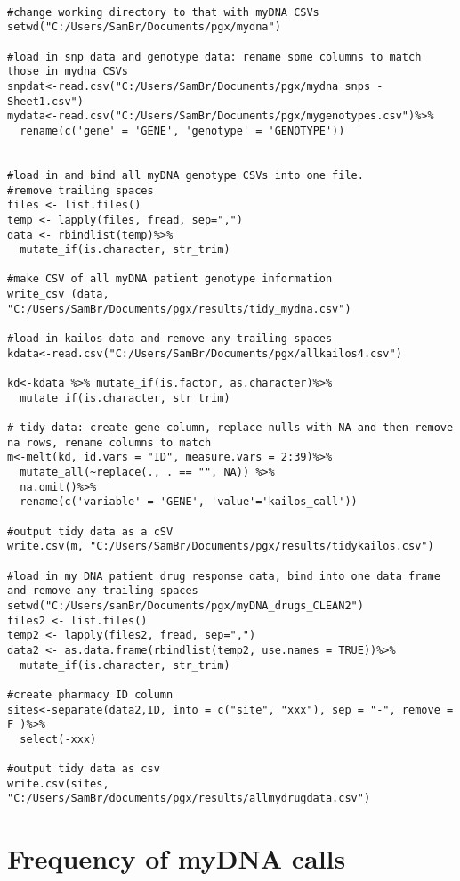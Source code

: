 \documentclass[]{article}
\begin{document}
\begin{verbatim}

#change working directory to that with myDNA CSVs
setwd("C:/Users/SamBr/Documents/pgx/mydna")

#load in snp data and genotype data: rename some columns to match those in mydna CSVs
snpdat<-read.csv("C:/Users/SamBr/Documents/pgx/mydna snps - Sheet1.csv")
mydata<-read.csv("C:/Users/SamBr/Documents/pgx/mygenotypes.csv")%>%
  rename(c('gene' = 'GENE', 'genotype' = 'GENOTYPE'))
  

#load in and bind all myDNA genotype CSVs into one file.
#remove trailing spaces
files <- list.files()
temp <- lapply(files, fread, sep=",")
data <- rbindlist(temp)%>%
  mutate_if(is.character, str_trim)

#make CSV of all myDNA patient genotype information
write_csv (data, "C:/Users/SamBr/Documents/pgx/results/tidy_mydna.csv")

#load in kailos data and remove any trailing spaces
kdata<-read.csv("C:/Users/SamBr/Documents/pgx/allkailos4.csv")

kd<-kdata %>% mutate_if(is.factor, as.character)%>%
  mutate_if(is.character, str_trim)

# tidy data: create gene column, replace nulls with NA and then remove na rows, rename columns to match 
m<-melt(kd, id.vars = "ID", measure.vars = 2:39)%>%
  mutate_all(~replace(., . == "", NA)) %>%
  na.omit()%>%
  rename(c('variable' = 'GENE', 'value'='kailos_call'))

#output tidy data as a cSV
write.csv(m, "C:/Users/SamBr/Documents/pgx/results/tidykailos.csv")

#load in my DNA patient drug response data, bind into one data frame and remove any trailing spaces
setwd("C:/Users/samBr/Documents/pgx/myDNA_drugs_CLEAN2")
files2 <- list.files()
temp2 <- lapply(files2, fread, sep=",")
data2 <- as.data.frame(rbindlist(temp2, use.names = TRUE))%>%
  mutate_if(is.character, str_trim)

#create pharmacy ID column 
sites<-separate(data2,ID, into = c("site", "xxx"), sep = "-", remove = F )%>%
  select(-xxx)

#output tidy data as csv
write.csv(sites, "C:/Users/SamBr/documents/pgx/results/allmydrugdata.csv")
\end{verbatim}

\section{Frequency of myDNA calls}\label{frequency-of-mydna-calls}
\end{document}
